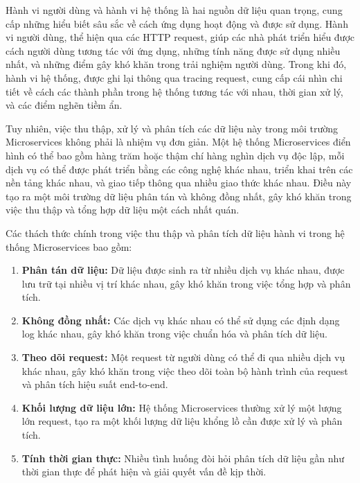 \documentclass{uetgraduation}
\begin{document}
Hành vi người dùng và hành vi hệ thống là hai nguồn dữ liệu quan trọng, cung cấp những hiểu biết sâu sắc về cách ứng dụng hoạt động và được sử dụng. Hành vi người dùng, thể hiện qua các HTTP request, giúp các nhà phát triển hiểu được cách người dùng tương tác với ứng dụng, những tính năng được sử dụng nhiều nhất, và những điểm gây khó khăn trong trải nghiệm người dùng. Trong khi đó, hành vi hệ thống, được ghi lại thông qua tracing request, cung cấp cái nhìn chi tiết về cách các thành phần trong hệ thống tương tác với nhau, thời gian xử lý, và các điểm nghẽn tiềm ẩn.

Tuy nhiên, việc thu thập, xử lý và phân tích các dữ liệu này trong môi trường Microservices không phải là nhiệm vụ đơn giản. Một hệ thống Microservices điển hình có thể bao gồm hàng trăm hoặc thậm chí hàng nghìn dịch vụ độc lập, mỗi dịch vụ có thể được phát triển bằng các công nghệ khác nhau, triển khai trên các nền tảng khác nhau, và giao tiếp thông qua nhiều giao thức khác nhau. Điều này tạo ra một môi trường dữ liệu phân tán và không đồng nhất, gây khó khăn trong việc thu thập và tổng hợp dữ liệu một cách nhất quán.

Các thách thức chính trong việc thu thập và phân tích dữ liệu hành vi trong hệ thống Microservices bao gồm:

\begin{enumerate}
    \item \textbf{Phân tán dữ liệu:} Dữ liệu được sinh ra từ nhiều dịch vụ khác nhau, được lưu trữ tại nhiều vị trí khác nhau, gây khó khăn trong việc tổng hợp và phân tích.
    
    \item \textbf{Không đồng nhất:} Các dịch vụ khác nhau có thể sử dụng các định dạng log khác nhau, gây khó khăn trong việc chuẩn hóa và phân tích dữ liệu.
    
    \item \textbf{Theo dõi request:} Một request từ người dùng có thể đi qua nhiều dịch vụ khác nhau, gây khó khăn trong việc theo dõi toàn bộ hành trình của request và phân tích hiệu suất end-to-end.
    
    \item \textbf{Khối lượng dữ liệu lớn:} Hệ thống Microservices thường xử lý một lượng lớn request, tạo ra một khối lượng dữ liệu khổng lồ cần được xử lý và phân tích.
    
    \item \textbf{Tính thời gian thực:} Nhiều tình huống đòi hỏi phân tích dữ liệu gần như thời gian thực để phát hiện và giải quyết vấn đề kịp thời.
\end{enumerate}
\end{document}
